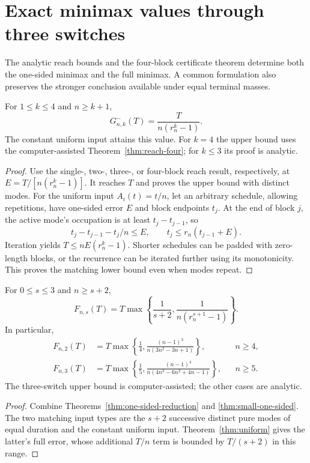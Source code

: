 \section{Exact minimax values through three switches}\label{sec:small-minimax}

The analytic reach bounds and the four-block certificate theorem determine
both the one-sided minimax and the full minimax. A common formulation also
preserves the stronger conclusion available under equal terminal masses.

\begin{theorem}\label{thm:small-one-sided}
For $1\le k\le4$ and $n\ge k+1$,
\begin{equation}\label{eq:small-one-sided}
 G^-_{n,k}(T)=\frac{T}{n(r_n^k-1)}.
\end{equation}
The constant uniform input attains this value. For $k=4$ the upper bound
uses the computer-assisted Theorem~\ref{thm:reach-four}; for $k\le3$ its
proof is analytic.
\end{theorem}
\begin{proof}
Use the single-, two-, three-, or four-block reach result, respectively,
at $E=T/[n(r_n^k-1)]$. It reaches $T$ and proves the upper bound with
distinct modes. For the uniform input $A_i(t)=t/n$, let an arbitrary
schedule, allowing repetitions, have one-sided error $E$ and block
endpoints $t_j$. At the end of block $j$, the active mode's occupation
is at least $t_j-t_{j-1}$, so
\[
 t_j-t_{j-1}-t_j/n\le E,
 \qquad t_j\le r_n(t_{j-1}+E).
\]
Iteration yields $T\le nE(r_n^k-1)$. Shorter schedules can be padded
with zero-length blocks, or the recurrence can be iterated further using
its monotonicity. This proves the matching lower bound even when modes
repeat.
\end{proof}

\begin{theorem}\label{thm:small-full}
For $0\le s\le3$ and $n\ge s+2$,
\begin{equation}\label{eq:small-full}
 F_{n,s}(T)=T\max\left\{\frac1{s+2},
                  \frac1{n(r_n^{s+1}-1)}\right\}.
\end{equation}
In particular,
\begin{align}
 F_{n,2}(T)&=T\max\left\{\frac14,
           \frac{(n-1)^3}{n(3n^2-3n+1)}\right\}, && n\ge4,
           \label{eq:two-switch-exact}\\
 F_{n,3}(T)&=T\max\left\{\frac15,
           \frac{(n-1)^4}{n(4n^3-6n^2+4n-1)}\right\}, && n\ge5.
           \label{eq:three-switch-exact}
\end{align}
The three-switch upper bound is computer-assisted; the other cases are
analytic.
\end{theorem}
\begin{proof}
Combine Theorems~\ref{thm:one-sided-reduction} and
\ref{thm:small-one-sided}. The two matching input types are the $s+2$
successive distinct pure modes of equal duration and the constant uniform
input. Theorem~\ref{thm:uniform} gives the latter's full error, whose
additional $T/n$ term is bounded by $T/(s+2)$ in this range.
\end{proof}

